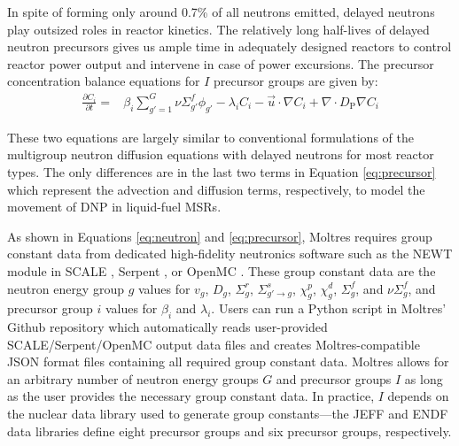 In spite of forming only around 0.7\% of all neutrons emitted, delayed neutrons
play outsized roles in reactor kinetics. The relatively long half-lives of
delayed neutron precursors gives us ample time in adequately designed reactors
to control reactor power output and intervene in case of power excursions.
The precursor concentration balance equations for $I$ precursor
groups are given by:
%
\begin{align}
    \frac{\partial C_i}{\partial t} =& \beta_i \sum^G_{g'=1} \nu \Sigma^f_{g'}
    \phi_{g'} - \lambda_i C_i - \vec{u} \cdot \nabla C_i + \nabla \cdot
    D_{\text{P}} \nabla C_i \label{eq:precursor} %
\end{align}

These two equations are largely similar to conventional formulations of the
multigroup neutron diffusion equations with delayed neutrons for most reactor
types. The only differences are in the last two terms in Equation
\ref{eq:precursor}
which represent the advection and diffusion terms, respectively, to model the
movement of \gls{DNP} in liquid-fuel \glspl{MSR}.

As shown in Equations \ref{eq:neutron} and \ref{eq:precursor}, Moltres requires
group constant data from dedicated high-fidelity neutronics software such as
the NEWT module in SCALE \cite{dehart_reactor_2011}, Serpent
\cite{leppanen_serpent_2014}, or OpenMC \cite{romano_openmc:_2015}. These group
constant data are the neutron energy group $g$ values for $v_g$, $D_g$,
$\Sigma^r_g$, $\Sigma^s_{g' \rightarrow g}$, $\chi^p_g$, $\chi^d_g$,
$\Sigma^f_{g}$, and $\nu\Sigma^f_{g}$, and precursor group $i$ values for
$\beta_i$ and $\lambda_i$. Users
can run a Python script in Moltres' Github repository which automatically reads
user-provided SCALE/Serpent/OpenMC output data files and creates
Moltres-compatible JSON format files containing all required group constant
data. Moltres allows for an arbitrary number of neutron energy groups $G$ and
precursor groups $I$ as long as the user provides the necessary group constant
data. In practice, $I$ depends on the nuclear data library used to generate
group constants---the JEFF \cite{plompen_joint_2020} and ENDF
\cite{brown_endfb-viii0_2018} data libraries define eight precursor groups
and six precursor groups, respectively.


